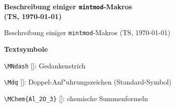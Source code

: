 


\begin{huge}
\parbox[t]{\textwidth}{%
{\sf\bfseries Beschreibung einiger {\tt mintmod}-Makros\\
\rm (TS, \today)}}
\end{huge}
%
{Beschreibung einiger {\tt mintmod}-Makros (TS, \today)}
\thispagestyle{plain}

\bigskip
\bigbreak\par\noindent
{\LARGE\sf\bfseries Textsymbole}
\medskip\par\noindent
{\color{blue}\verb+\MNdash+}
[{\color{red}\MNdash}]: Gedankenstrich %
\smallskip\par\noindent
{\color{blue}\verb+\Mdq+}
[{\color{red}\Mdq}]: Doppel-Anf"uhrungszeichen (Standard-Symbol)
\smallskip\par\noindent
{\color{blue}\verb+\MChem{Al_2O_3}+}
[{\color{red}}]: chemische Summenformeln


